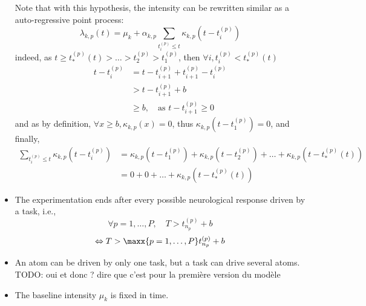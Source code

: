\begin{itemize}
    Note that with this hypothesis, the intensity can be rewritten similar as a auto-regressive point process:
    \begin{equation}
        \lambda_{k,p}(t)  = \mu_k + \alpha_{k,p}\sum_{t_i^{(p)} \leq t} \kappa_{k,p}(t - t_i^{(p)})
    \end{equation}
    indeed, as $t \geq t_*^{(p)}(t) > \dots > t_2^{(p)} > t_1^{(p)}$, then $\forall i, t_i^{(p)} < t_*^{(p)}(t)$
    \begin{align*}
        t - t_i^{(p)} &= t - t_{i+1}^{(p)} + t_{i+1}^{(p)} - t_i^{(p)} \\
        &> t - t_{i+1}^{(p)} + b \\
        &\geq b, \quad \text{as } t - t_{i+1}^{(p)}\geq 0
    \end{align*}
    and as by definition, $\forall x \geq b, \kappa_{k,p}(x)=0$, thus $\kappa_{k,p}(t - t_1^{(p)}) = 0$, and finally,
    \begin{align*}
        \sum_{t_i^{(p)} \leq t} \kappa_{k,p}(t - t_i^{(p)}) &= \kappa_{k,p}(t - t_1^{(p)}) + \kappa_{k,p}(t - t_2^{(p)}) + \dots + \kappa_{k,p}(t - t_*^{(p)}(t)) \\
        &= 0 + 0 + \dots + \kappa_{k,p}(t - t_*^{(p)}(t))
    \end{align*}
    
    \item The experimentation ends after every possible neurological response driven by a task, i.e.,
    \begin{equation}\label{eq:long_duration}
        \forall p=1,\dots,P, \quad T > t_{n_p}^{(p)} + b
    \end{equation}
    $$
    \Leftrightarrow T > \maxx{p=1,\dots,P} t_{n_p}^{(p)} + b
    $$
    \item An atom can be driven by only one task, but a task can drive several atoms. TODO: oui et donc ? dire que c'est pour la première version du modèle
    
    \item The baseline intensity $\mu_k$ is fixed in time.
\end{itemize}